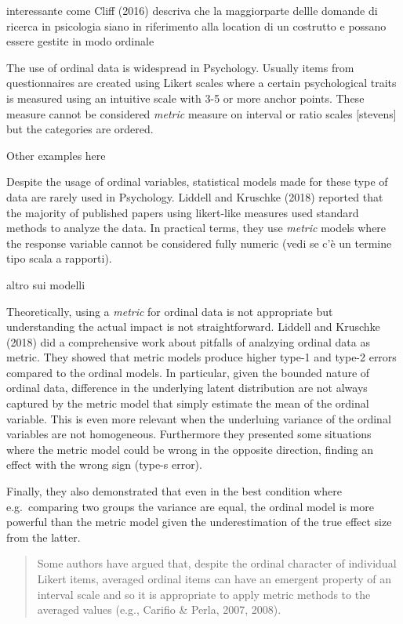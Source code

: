 \documentclass[
  man,floatsintext]{apa6}
\begin{document}
interessante come Cliff (2016) descriva che la maggiorparte dellle domande di ricerca in psicologia siano in riferimento alla location di un costrutto e possano essere gestite in modo ordinale

The use of ordinal data is widespread in Psychology. Usually items from questionnaires are created using Likert scales where a certain psychological traits is measured using an intuitive scale with 3-5 or more anchor points. These measure cannot be considered \emph{metric} measure on interval or ratio scales {[}stevens{]} but the categories are ordered.

Other examples here

Despite the usage of ordinal variables, statistical models made for these type of data are rarely used in Psychology. Liddell and Kruschke (2018) reported that the majority of published papers using likert-like measures used standard methods to analyze the data. In practical terms, they use \emph{metric} models where the response variable cannot be considered fully numeric (vedi se c'è un termine tipo scala a rapporti).

altro sui modelli

Theoretically, using a \emph{metric} for ordinal data is not appropriate but understanding the actual impact is not straightforward. Liddell and Kruschke (2018) did a comprehensive work about pitfalls of analzying ordinal data as metric. They showed that metric models produce higher type-1 and type-2 errors compared to the ordinal models. In particular, given the bounded nature of ordinal data, difference in the underlying latent distribution are not always captured by the metric model that simply estimate the mean of the ordinal variable. This is even more relevant when the underluing variance of the ordinal variables are not homogeneous. Furthermore they presented some situations where the metric model could be wrong in the opposite direction, finding an effect with the wrong sign (type-s error).

Finally, they also demonstrated that even in the best condition where e.g.~comparing two groups the variance are equal, the ordinal model is more powerful than the metric model given the underestimation of the true effect size from the latter.

\begin{quote}
Some authors have argued that, despite the ordinal character of individual Likert items, averaged ordinal items can have an emergent property of an interval scale and so it is appropriate to apply metric methods to the averaged values (e.g., Carifio \& Perla, 2007, 2008).
\end{quote}
\end{document}
